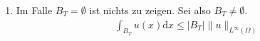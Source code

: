 
\begin{solution}

\phantom{}

\begin{enumerate}[label = \textbf{\alph*)}]
  \item Im Falle $B_T = \emptyset$ ist nichts zu zeigen. Sei also $B_T \neq \emptyset$.
  \begin{align*}
    \int_{B_T} u(x) \mathrm{d} x \leq |B_T|\|u\|_{L^\infty(\Omega)}
  \end{align*}
\end{enumerate}

\end{solution}

